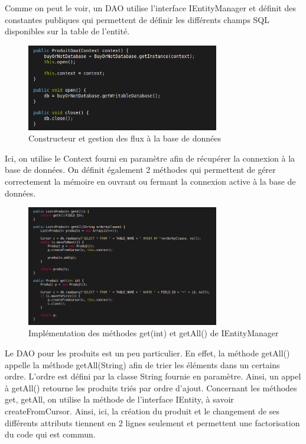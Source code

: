 \documentclass[report]{BetterDocument}
\newcommand{\bdd}{base de données}
\begin{document}
			Comme on peut le voir, un DAO utilise l'interface IEntityManager et définit des constantes publiques qui permettent de définir les différents champs SQL disponibles sur la table de l'entité.

			\begin{figure}[H]
				\centering\includegraphics[width=0.75\textwidth, keepaspectratio]{img/bdd/dao_open_close.png}
				\caption{Constructeur et gestion des flux à la \bdd{}}
			\end{figure}

			Ici, on utilise le Context fourni en paramètre afin de récupérer la connexion à la \bdd{}. On définit également 2 méthodes qui permettent de gérer correctement la mémoire en ouvrant ou fermant la connexion active à la \bdd{}.

			\begin{figure}[H]
				\centering\includegraphics[width=0.75\textwidth, keepaspectratio]{img/bdd/dao_methodes_gets.png}
				\caption{Implémentation des méthodes get(int) et getAll() de IEntityManager}
			\end{figure}

			Le DAO pour les produits est un peu particulier. En effet, la méthode getAll() appelle la méthode getAll(String) afin de trier les éléments dans un certains ordre. L'ordre est défini par la classe String fournie en paramètre. Ainsi, un appel à getAll() retourne les produits triés par ordre d'ajout. Concernant les méthodes get, getAll, on utilise la méthode de l'interface IEntity, à savoir createFromCursor. Ainsi, ici, la création du produit et le changement de ses différents attributs tiennent en 2 lignes seulement et permettent une factorisation du code qui est commun.
\end{document}
